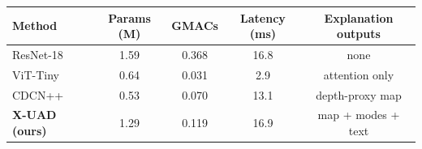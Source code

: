 \begin{tabular}{lcccc}
\toprule
Method & Params (M) & GMACs & Latency (ms) & Explanation outputs \\
\midrule
ResNet-18~\cite{he2016resnet} & 1.59 & 0.368 & 16.8 & none \\
ViT-Tiny~\cite{dosovitskiy2021vit} & 0.64 & 0.031 & 2.9 & attention only \\
CDCN++~\cite{yu2020cdcn} & 0.53 & 0.070 & 13.1 & depth-proxy map \\
\textbf{X-UAD (ours)} & 1.29 & 0.119 & 16.9 & map + modes + text \\
\bottomrule
\end{tabular}